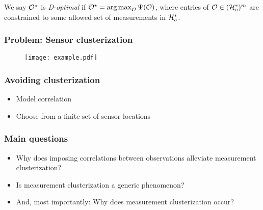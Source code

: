 \documentclass{beamer}
\begin{document}
\begin{frame}
  \begin{definition}\label{def:d optimality}
  We say \(\mathcal{O}^{\star}\) is \emph{D-optimal} if \(\mathcal{O}^{\star} =
  \operatorname*{arg\,max}_{\mathcal{O}} \Psi(\mathcal{O})\), where entries of \(\mathcal{O} \in (\mathcal{H}_o^*)^m\)
  are constrained to some allowed set of measurements in \(\mathcal{H}_o^*\).
\end{definition}

  \end{frame}
\begin{frame}
\frametitle{Problem: Sensor clusterization}
\begin{figure}
    \centering
    \texttt{[image: example.pdf]}
\end{figure}

\end{frame}

\begin{frame}
\frametitle{Avoiding clusterization}
\begin{itemize}
\item Model correlation
\item Choose from a finite set of sensor locations
\end{itemize}
\end{frame}

\begin{frame}
\frametitle{Main questions}
\begin{itemize}
\item Why does imposing correlations between observations alleviate
measurement clusterization?
%
\item Is measurement clusterization a generic phenomenon?
%
\item And, most importantly: Why does measurement clusterization occur?
\end{itemize}
\end{frame}
\end{document}
